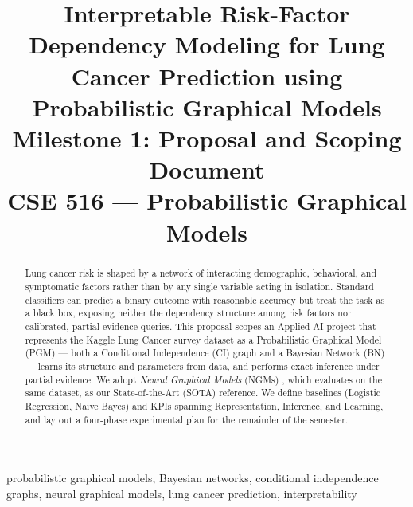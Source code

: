 \documentclass[conference]{IEEEtran}
\begin{document}
	
	\title{Interpretable Risk-Factor Dependency Modeling for Lung Cancer Prediction using Probabilistic Graphical Models\\[4pt]
		\large Milestone 1: Proposal and Scoping Document\\[4pt] CSE 516 --- Probabilistic Graphical Models}
	
	\author{
	}
	
	\maketitle
	
	\begin{abstract}
		Lung cancer risk is shaped by a network of interacting demographic, behavioral, and symptomatic factors rather than by any single variable acting in isolation. Standard classifiers can predict a binary outcome with reasonable accuracy but treat the task as a black box, exposing neither the dependency structure among risk factors nor calibrated, partial-evidence queries. This proposal scopes an Applied AI project that represents the Kaggle Lung Cancer survey dataset as a Probabilistic Graphical Model (PGM) --- both a Conditional Independence (CI) graph and a Bayesian Network (BN) --- learns its structure and parameters from data, and performs exact inference under partial evidence. We adopt \emph{Neural Graphical Models} (NGMs) \cite{ngm2022}, which evaluates on the same dataset, as our State-of-the-Art (SOTA) reference. We define baselines (Logistic Regression, Naive Bayes) and KPIs spanning Representation, Inference, and Learning, and lay out a four-phase experimental plan for the remainder of the semester.
	\end{abstract}
	
	\begin{IEEEkeywords}
		probabilistic graphical models, Bayesian networks, conditional independence graphs, neural graphical models, lung cancer prediction, interpretability
	\end{IEEEkeywords}
	
\end{document}
